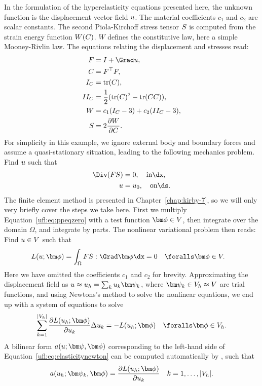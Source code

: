 In the formulation of the hyperelasticity equations presented
here, the unknown function is the displacement vector field ${u}$.
The material coefficients $c_1$ and $c_2$ are scalar constants.
The second Piola-Kirchoff stress tensor ${S}$ is computed from the
strain energy function $W({C})$. $W$ defines the constitutive law, here
a simple Mooney-Rivlin law. The equations relating the displacement and
stresses read:
\begin{align}
\begin{split}
\FF   &=  \II + \Grad \uu, \\
\CC   &=  \FF^{\top}\FF, \\
I_C   &=  \mop{tr}(\CC), \\
II_C  &=  \frac 1 2 (\mop{tr}(\CC)^2 - \mop{tr}(\CC\CC)), \\
W     &=  c_1(I_C - 3) + c_2(II_C - 3), \\
\SS   &=  2\frac{\partial W}{\partial\CC}.  \label{ufl:eq:hypdef}
\end{split}
\end{align}
For simplicity in this example, we ignore external body and boundary
forces and assume a quasi-stationary situation, leading to the following
mechanics problem. Find ${u}$ such that
\begin{align}
\Div (\FF\SS) &= 0, \quad \mbox{in} \dx, \label{ufl:eq:ppeqzero} \\
\uu &= \uu_0,       \quad \mbox{on} \ds.
\end{align}
The finite element method is presented in Chapter~\ref{chap:kirby-7},
so we will only very briefly cover the steps we take here.  First we
multiply Equation~\eqref{ufl:eq:ppeqzero} with a test function $\bphi
\in V$, then integrate over the domain $\Omega$, and integrate by parts.
The nonlinear variational problem then reads: Find ${u} \in V$ such that
\begin{align}
L(\uu; \bphi) &= \int_\Omega \FF\SS : \Grad\bphi \dx = 0
  \quad \foralls \bphi \in V. \label{ufl:eq:hypdefL}
\end{align}
Here we have omitted the coefficients $c_1$ and $c_2$ for brevity.
Approximating the displacement field as $\uu \approx \uu_h = \sum_k
u_k \bpsi_k$, where $\bpsi_k \in V_h \approx V$ are trial functions,
and using Newtons's method to solve the nonlinear equations, we end up
with a system of equations to solve
\begin{align}
\sum_{k=1}^{|V_h|} \frac{\partial L(\uu_h; \bphi)}{\partial u_k} \Delta u_k =
  -L(\uu_h; \bphi)
  \quad \foralls \bphi \in V_h. \label{ufl:eq:elasticitynewton}
\end{align}
A bilinear form $a(\uu; \bpsi, \bphi)$ corresponding to the left-hand side
of Equation~\eqref{ufl:eq:elasticitynewton} can be computed automatically
by \ufl{}, such that
\begin{align}
a(\uu_h; \bpsi_k, \bphi) = \frac{\partial L(\uu_h; \bphi)}{\partial u_k}
  \quad k = 1, \ldots, |V_h|. \label{alnes-1:eq:hypdefa}
\end{align}

